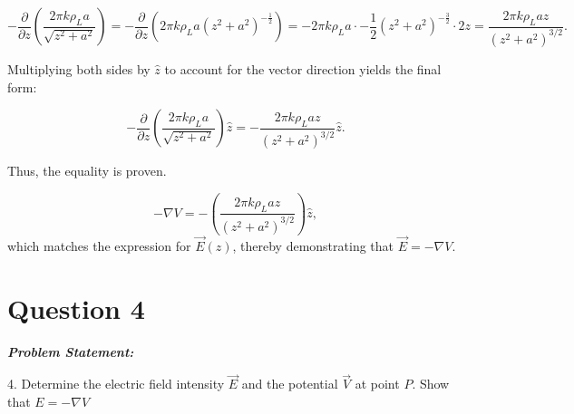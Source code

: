 \documentclass[12pt]{article}
\newenvironment{q}
{
    \begin{qframe}
    \noindent\textit{\textbf{Problem Statement:}}
    \par\smallskip
}
{
    \end{qframe}
}
\begin{document}
\[
-\frac{\partial}{\partial z}\left(\frac{2\pi k \rho_L a}{\sqrt{z^2+a^2}}\right) = -\frac{\partial}{\partial z}\left(2\pi k \rho_L a(z^2+a^2)^{-\frac{1}{2}}\right) = -2\pi k \rho_L a \cdot -\frac{1}{2}(z^2+a^2)^{-\frac{3}{2}} \cdot 2z = \frac{2\pi k \rho_L a z}{(z^2+a^2)^{3/2}}.
\]

Multiplying both sides by \(\hat{z}\) to account for the vector direction yields the final form:

\[
-\frac{\partial}{\partial z}\left(\frac{2\pi k \rho_L a}{\sqrt{z^2+a^2}}\right) \hat{z} = -\frac{2\pi k \rho_L a z}{(z^2 + a^2)^{3/2}} \hat{z}.
\]

Thus, the equality is proven.

\[
-\nabla V = -\left(\frac{2\pi k \rho_L a z}{(z^2 + a^2)^{3/2}}\right) \hat{z},
\]
which matches the expression for \(\vec{E}(z)\), thereby demonstrating that \(\vec{E} = -\nabla V\).

\newpage
\section*{Question 4}
\begin{q}
4. Determine the electric field intensity \(\vec{E}\) and the potential \(\vec{V}\) at point \(P\). Show that \(E=-\nabla V\)
\end{q}
\end{document}
